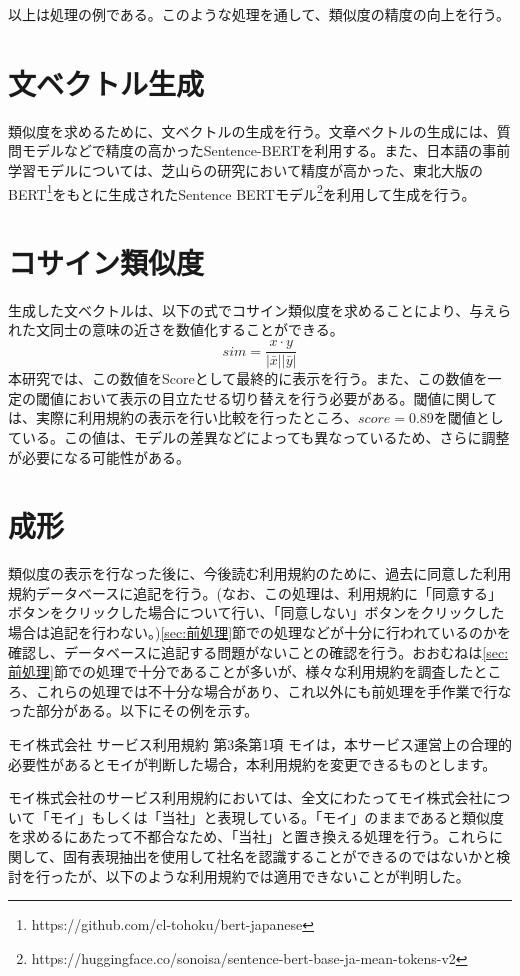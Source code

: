以上は処理の例である。このような処理を通して、類似度の精度の向上を行う。

\section{文ベクトル生成}
類似度を求めるために、文ベクトルの生成を行う。文章ベクトルの生成には、質問モデルなどで精度の高かったSentence-BERTを利用する。また、日本語の事前学習モデルについては、芝山ら\cite{weko_212207_1}の研究において精度が高かった、東北大版のBERT\footnote{https://github.com/cl-tohoku/bert-japanese}をもとに生成されたSentence BERTモデル\footnote{https://huggingface.co/sonoisa/sentence-bert-base-ja-mean-tokens-v2}を利用して生成を行う。

\section{コサイン類似度}
生成した文ベクトルは、以下の式でコサイン類似度を求めることにより、与えられた文同士の意味の近さを数値化することができる。
$$sim = \frac{x\cdot y}{|\bar{x}||\bar{y}|}$$
本研究では、この数値をScoreとして最終的に表示を行う。また、この数値を一定の閾値において表示の目立たせる切り替えを行う必要がある。閾値に関しては、実際に利用規約の表示を行い比較を行ったところ、$score=0.89$を閾値としている。この値は、モデルの差異などによっても異なっているため、さらに調整が必要になる可能性がある。

\section{成形}
\label{sec:成形}
類似度の表示を行なった後に、今後読む利用規約のために、過去に同意した利用規約データベースに追記を行う。(なお、この処理は、利用規約に「同意する」ボタンをクリックした場合について行い、「同意しない」ボタンをクリックした場合は追記を行わない。)\ref{sec:前処理}節での処理などが十分に行われているのかを確認し、データベースに追記する問題がないことの確認を行う。おおむねは\ref{sec:前処理}節での処理で十分であることが多いが、様々な利用規約を調査したところ、これらの処理では不十分な場合があり、これ以外にも前処理を手作業で行なった部分がある。以下にその例を示す。

\begin{itembox}[l]{モイ株式会社 サービス利用規約 第3条第1項}
  モイは，本サービス運営上の合理的必要性があるとモイが判断した場合，本利用規約を変更できるものとします。
\end{itembox}  

モイ株式会社のサービス利用規約においては、全文にわたってモイ株式会社について「モイ」もしくは「当社」と表現している。「モイ」のままであると類似度を求めるにあたって不都合なため、「当社」と置き換える処理を行う。これらに関して、固有表現抽出を使用して社名を認識することができるのではないかと検討を行ったが、以下のような利用規約では適用できないことが判明した。

